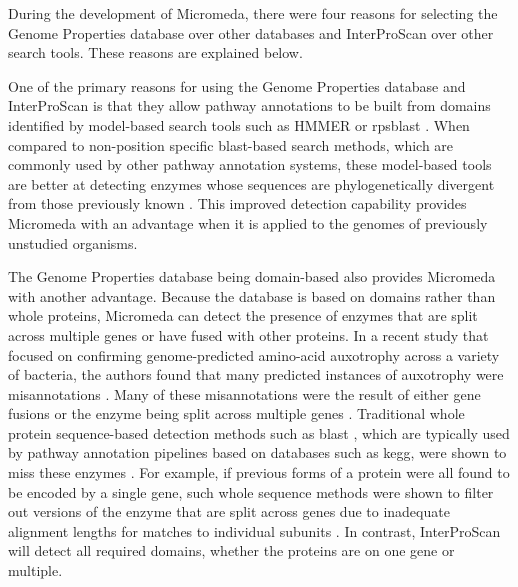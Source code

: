 During the development of Micromeda, there were four reasons for selecting the 
Genome Properties database over other databases and InterProScan over other 
search tools. These reasons are explained below.

One of the primary reasons for using the Genome Properties database and 
InterProScan is that they allow pathway annotations to be built from domains 
identified by model-based search tools such as HMMER \cite{eddy2011accelerated} 
or \gls{rpsblast} \cite{mcginnis2004blast}. When compared to non-position
specific \gls{blast}-based \cite{altschul1990basic} search methods, which are 
commonly used by other pathway annotation systems, these model-based tools are 
better at detecting enzymes whose sequences are phylogenetically divergent from 
those previously known \cite{eddy2011accelerated}. This improved detection 
capability provides Micromeda with an advantage when it is applied to the 
genomes of previously unstudied organisms.

The Genome Properties database being domain-based also provides Micromeda with 
another advantage. Because the database is based on domains rather than whole 
proteins, Micromeda can detect the presence of enzymes that are split across 
multiple genes or have fused with other proteins. In a recent study that focused 
on confirming genome-predicted amino-acid auxotrophy across a variety of 
bacteria, the authors found that many predicted instances of auxotrophy were 
misannotations \cite{price2018filling}. Many of these misannotations were the 
result of either gene fusions or the enzyme being split across multiple genes 
\cite{price2018filling}. Traditional whole protein sequence-based detection 
methods such as \gls{blast} \cite{altschul1990basic}, which are typically used 
by pathway annotation pipelines based on databases such as \gls{kegg}, were 
shown to miss these enzymes \cite{price2018filling}. For example, if previous 
forms of a protein were all found to be encoded by a single gene, such whole 
sequence methods were shown to filter out versions of the enzyme that are split 
across genes due to inadequate alignment lengths for matches to individual 
subunits \cite{price2018filling}. In contrast, InterProScan will detect all 
required domains, whether the proteins are on one gene or multiple.

